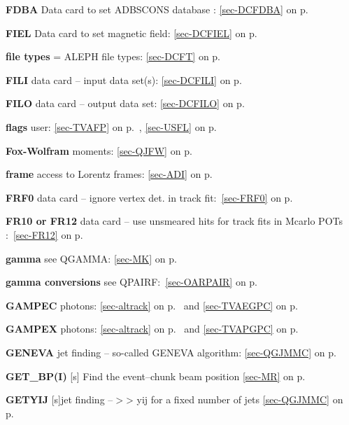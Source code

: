  \item{\bf FDBA }Data card to set ADBSCONS database :  \ref{sec-DCFDBA} on p.~\pageref{sec-DCFDBA}\\
 \item{\bf FIEL }Data card to set magnetic field: \ref{sec-DCFIEL} on p.~\pageref{sec-DCFIEL}\\
 \item{\bf file types  }= ALEPH file types: \ref{sec-DCFT} on p.~\pageref{sec-DCFT}\\
 \item{\bf FILI    }data card -- input data set(s): \ref{sec-DCFILI} on p.~\pageref{sec-DCFILI}\\
 \item{\bf FILO    }data card -- output data set: \ref{sec-DCFILO} on p.~\pageref{sec-DCFILO}\\
 \item{\bf flags   }user: \ref{sec-TVAFP} on p.~\pageref{sec-TVAFP},
 \ref{sec-USFL} on p.~\pageref{sec-USFL}\\
 \item{\bf Fox-Wolfram }moments: \ref{sec-QJFW} on p.~\pageref{sec-QJFW}\\
 \item{\bf frame   }access to Lorentz frames: \ref{sec-ADI} on p.~\pageref{sec-ADI}\\
 \item{\bf FRF0  }data card -- ignore vertex det. in track
 fit:~\ref{sec-FRF0} on p.~\pageref{sec-FRF0}\\
 \item{\bf FR10 or FR12  }data card -- use unsmeared hits for track fits in Mcarlo POTs
 :~\ref{sec-FR12} on p.~\pageref{sec-FR12}
 
 \item{\bf gamma   }see QGAMMA: \ref{sec-MK} on p.~\pageref{sec-MK}\\
 \item{\bf gamma conversions }see QPAIRF:~\ref{sec-OARPAIR} on
 p.~\pageref{sec-OARPAIR}\\
 \item{\bf GAMPEC }photons: \ref{sec-altrack}
 on p.~\pageref{sec-altrack} and
 \ref{sec-TVAEGPC} on p.~\pageref{sec-TVAEGPC}\\
 \item{\bf GAMPEX }photons: \ref{sec-altrack}
 on p.~\pageref{sec-altrack} and
 \ref{sec-TVAPGPC} on p.~\pageref{sec-TVAPGPC}\\
 \item{\bf GENEVA  }jet finding -- so-called GENEVA algorithm:           
 \ref{sec-QGJMMC} on p.~\pageref{sec-QGJMMC}\\
 \item{\bf GET\_BP(I) }[s] Find the event--chunk beam position
 \ref{sec-MR} on p.~\pageref{sec-MR}\\
  \item{\bf GETYIJ  }[s]jet finding --$>$> yij for a fixed number of jets
 \ref{sec-QGJMMC} on p.~\pageref{sec-QGJMMC}\\

